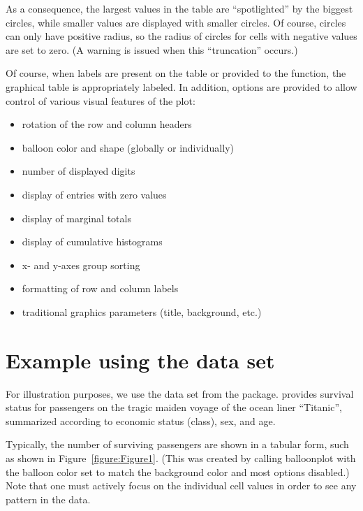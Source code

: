 \documentclass[a4paper]{report}
\begin{document}
\begin{article}
As a consequence, the largest values in the table are
``spotlighted'' by the biggest circles, while smaller values are
displayed with smaller circles.  Of course, circles can only have
positive radius, so the radius of circles for cells with negative
values are set to zero.  (A warning is issued when this
``truncation'' occurs.)

Of course, when labels are present on the table or provided to the
function, the graphical table is appropriately labeled.  In
addition, options are provided to allow control of various visual features
of the plot:

\begin{itemize}
  \item rotation of the row and column headers
  \item balloon color and shape (globally or individually)
  \item number of displayed digits
  \item display of entries with zero values
  \item display of marginal totals
  \item display of cumulative histograms
  \item x- and y-axes group sorting
  \item formatting of row and column labels
  \item traditional graphics parameters (title,
    background, etc.)
\end{itemize}

\section*{Example using the  data set}

For illustration purposes, we use the  data set from
the  package.   provides survival status
for passengers on the tragic maiden voyage of the ocean liner
``Titanic'', summarized according to economic status (class), sex, and
age.

Typically, the number of surviving passengers are shown in a tabular
form, such as shown in Figure~\ref{figure:Figure1}.  (This was created
by calling balloonplot with the balloon color set to match the
background color and most options disabled.)  Note that one must
actively focus on the individual cell values in order to see any
pattern in the data.


\end{article}
\end{document}
